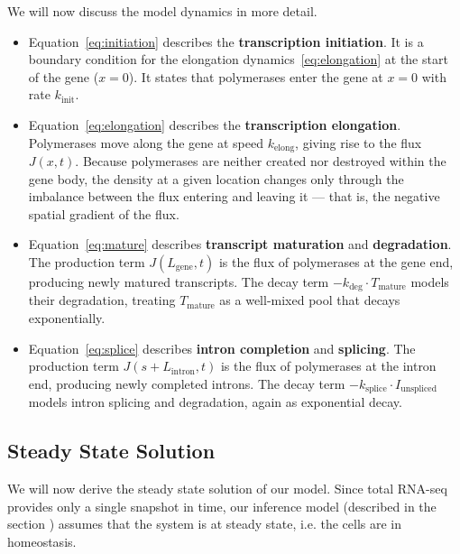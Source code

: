 \documentclass[11pt]{article}
\begin{document}
    
    We will now discuss the model dynamics in more detail.
   \begin{itemize}
	   \item Equation~\eqref{eq:initiation} describes the \textbf{transcription initiation}. It is a boundary condition for the elongation dynamics~\eqref{eq:elongation} at the start of the gene ($x=0$). It states that polymerases enter the gene at $x=0$ with rate $k_{\mathrm{init}}$.
	   
	   \item Equation~\eqref{eq:elongation} describes the \textbf{transcription elongation}. Polymerases move along the gene at speed $k_{\mathrm{elong}}$, giving rise to the flux $J(x,t)$. Because polymerases are neither created nor destroyed within the gene body, the density at a given location changes only through the imbalance between the flux entering and leaving it — that is, the negative spatial gradient of the flux.	   
	   
	   \item Equation~\eqref{eq:mature} describes \textbf{transcript maturation} and \textbf{degradation}. The production term $J(L_{\mathrm{gene}},t)$ is the flux of polymerases at the gene end, producing newly matured transcripts. The decay term $-k_{\mathrm{deg}} \cdot T_{\mathrm{mature}}$ models
	   their degradation, treating $T_{\mathrm{mature}}$ as a well-mixed pool that decays exponentially.	   
	       
	  \item Equation~\eqref{eq:splice} describes \textbf{intron completion} and \textbf{splicing}. The production term $J(s+L_{\mathrm{intron}},t)$ is the flux of polymerases at the intron end, producing newly completed introns. The decay term $-k_{\mathrm{splice}} \cdot I_{\mathrm{unspliced}}$ models intron splicing and degradation, again as exponential decay.
	    
   \end{itemize}

    \subsection{Steady State Solution} \label{subsec:steady_state}
    We will now derive the steady state solution of our model. Since total RNA-seq provides only a single snapshot in time, our inference model (described in the section ) assumes that the system is at steady state, i.e. the cells are in homeostasis.
    
\end{document}
